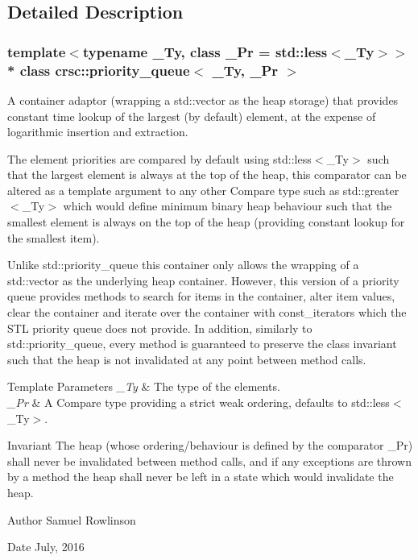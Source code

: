 \subsection{Detailed Description}
\subsubsection*{template$<$typename \+\_\+\+Ty, class \+\_\+\+Pr = std\+::less$<$\+\_\+\+Ty$>$$>$\\*
class crsc\+::priority\+\_\+queue$<$ \+\_\+\+Ty, \+\_\+\+Pr $>$}

A container adaptor (wrapping a {\ttfamily std\+::vector} as the heap storage) that provides constant time lookup of the largest (by default) element, at the expense of logarithmic insertion and extraction. 

The element priorities are compared by default using {\ttfamily std\+::less$<$\+\_\+\+Ty$>$} such that the largest element is always at the top of the heap, this comparator can be altered as a template argument to any other {\ttfamily Compare} type such as {\ttfamily std\+::greater$<$\+\_\+\+Ty$>$} which would define minimum binary heap behaviour such that the smallest element is always on the top of the heap (providing constant lookup for the smallest item).

Unlike {\ttfamily std\+::priority\+\_\+queue} this container only allows the wrapping of a {\ttfamily std\+::vector} as the underlying heap container. However, this version of a priority queue provides methods to search for items in the container, alter item values, clear the container and iterate over the container with {\ttfamily const\+\_\+iterator}s which the S\+TL priority queue does not provide. In addition, similarly to {\ttfamily std\+::priority\+\_\+queue}, every method is guaranteed to preserve the class invariant such that the heap is not invalidated at any point between method calls.


\begin{DoxyTemplParams}{Template Parameters}
{\em \+\_\+\+Ty} & The type of the elements. \\
\hline
{\em \+\_\+\+Pr} & A {\ttfamily Compare} type providing a strict weak ordering, defaults to {\ttfamily std\+::less$<$\+\_\+\+Ty$>$}. \\
\hline
\end{DoxyTemplParams}
\begin{DoxyInvariant}{Invariant}
The heap (whose ordering/behaviour is defined by the comparator {\ttfamily \+\_\+\+Pr}) shall never be invalidated between method calls, and if any exceptions are thrown by a method the heap shall never be left in a state which would invalidate the heap. 
\end{DoxyInvariant}
\begin{DoxyAuthor}{Author}
Samuel Rowlinson 
\end{DoxyAuthor}
\begin{DoxyDate}{Date}
July, 2016 
\end{DoxyDate}


